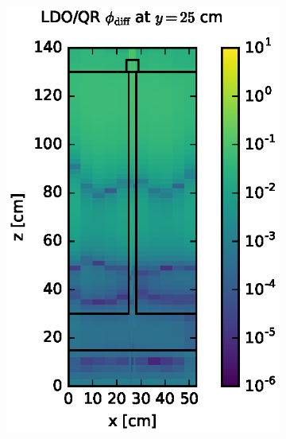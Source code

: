 \documentclass{article} %
\begin{document}
\begin{figure}[!htb]
\centering
\begin{subfigure}{0.4\textwidth}
\includegraphics[max height=0.445\textheight]
{steel-flux-diff-qr.eps}
\end{subfigure} ~
\begin{subfigure}{0.4\textwidth}

\end{subfigure}
\end{figure}
\end{document}
